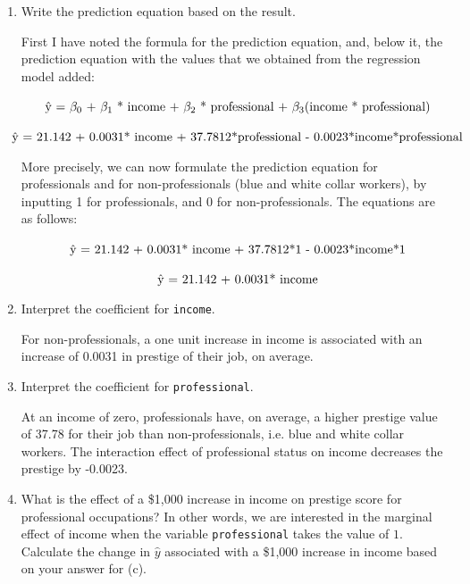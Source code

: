 \documentclass[12pt,letterpaper]{article}
\begin{document}
\begin{enumerate}
	\item [(c)]
	Write the prediction equation based on the result.
	
	First I have noted the formula for the prediction equation, and, below it, the prediction equation with the values that we obtained from the regression model added:
	
	$\makebox[\linewidth]{\^{y} = $\beta_0$ + $\beta_1$ * income + $\beta_2$ * professional + $\beta_3$(income * professional)}$
	
	$\makebox[\linewidth]{\^{y}  = 21.142 + 0.0031* income + 37.7812*professional - 0.0023*income*professional}$
	
	\vspace{.5cm}
	More precisely, we can now formulate the prediction equation for professionals and for non-professionals (blue and white collar workers), by inputting 1 for professionals, and 0 for non-professionals. The equations are as follows:
	
	$\makebox[\linewidth]{\^{y} = 21.142 + 0.0031* income + 37.7812*1 - 0.0023*income*1}$
	
	$\makebox[\linewidth]{\^{y}  = 21.142 + 0.0031* income}$
	\vspace{.25cm}
	\item [(d)]
	Interpret the coefficient for \texttt{income}.
	
	\vspace{.5cm}	
	
	For non-professionals, a one unit increase in income is associated with an increase of 0.0031 in prestige of their job, on average.
	\vspace{.5cm}
	\item [(e)]
	Interpret the coefficient for \texttt{professional}.
	\vspace{.5cm}
	
	At an income of zero, professionals have, on average, a higher prestige value of 37.78 for their job than non-professionals, i.e. blue and white collar workers. The interaction effect of professional status on income decreases the prestige by -0.0023.
	
	\vspace{.5cm}
	\item [(f)]
	What is the effect of a \$1,000 increase in income on prestige score for professional occupations? In other words, we are interested in the marginal effect of income when the variable \texttt{professional} takes the value of $1$. Calculate the change in $\hat{y}$ associated with a \$1,000 increase in income based on your answer for (c).
	

\end{enumerate}
\end{document}
